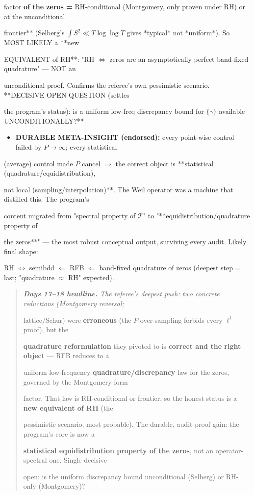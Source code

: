 \documentclass[10pt]{article}
\begin{document}
  factor\textbf{ of the zeros = }RH-conditional (Montgomery, only proven under RH) or at the unconditional\par
  frontier** (Selberg's $\int S^2\ll T\log\log T$ gives *typical* not *uniform*). So MOST LIKELY a **new\par
  EQUIVALENT of RH**: "RH \ensuremath{\iff} zeros are an asymptotically perfect band-fixed quadrature" --- NOT an\par
  unconditional proof. Confirms the referee's own pessimistic scenario. **DECISIVE OPEN QUESTION (settles\par
  the program's status): is a uniform low-freq discrepancy bound for $\{\gamma\}$ available UNCONDITIONALLY?**\par
\begin{itemize}
\item \textbf{DURABLE META-INSIGHT (endorsed):} every point-wise control failed by $P\to\infty$; every statistical
\end{itemize}
  (average) control made $P$ cancel \ensuremath{\Rightarrow} the correct object is **statistical (quadrature/equidistribution),\par
  not local (sampling/interpolation)**. The Weil operator was a machine that distilled this. The program's\par
  content migrated from "spectral property of $\mathcal T$" to "**equidistribution/quadrature property of\par
  the zeros**" --- the most robust conceptual output, surviving every audit. Likely final shape:\par
  RH \ensuremath{\iff} semibdd \ensuremath{\Leftarrow} RFB \ensuremath{\Leftarrow} band-fixed quadrature of zeros (deepest step = last; "quadrature \ensuremath{\approx} RH" expected).\par

\begin{quote}\itshape
\textbf{Days 17--18 headline.} The referee's deepest push: two concrete reductions (Montgomery reversal;\par
lattice/Schur) were \textbf{erroneous} (the $P$-over-sampling forbids every $\ell^1$ proof), but the\par
\textbf{quadrature reformulation} they pivoted to is \textbf{correct and the right object} --- RFB reduces to a\par
uniform low-frequency \textbf{quadrature/discrepancy} law for the zeros, governed by the Montgomery form\par
factor. That law is RH-conditional or frontier, so the honest status is a \textbf{new equivalent of RH} (the\par
pessimistic scenario, most probable). The durable, audit-proof gain: the program's core is now a\par
\textbf{statistical equidistribution property of the zeros}, not an operator-spectral one. Single decisive\par
open: is the uniform discrepancy bound unconditional (Selberg) or RH-only (Montgomery)?\par
\end{quote}
\end{document}
